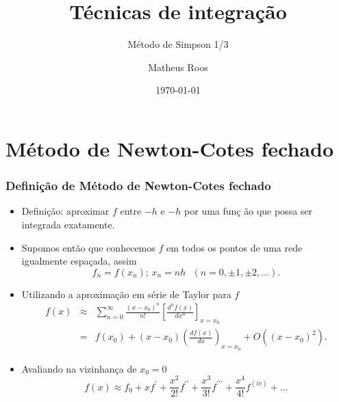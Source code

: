 \documentclass[xcolor=table]{beamer}
\begin{document}
\title[Simpson 1/3]{Técnicas de integração}
\subtitle{Método de Simpson 1/3}
\author[Roos]{Matheus Roos}
\date{\today}
\maketitle

\begin{frame}
	\tableofcontents
\end{frame}

\section{M\'{e}todo de Newton-Cotes fechado}

\begin{frame}%

\frametitle{Defini\c{c}\~{a}o de M\'{e}todo de Newton-Cotes fechado}

\begin{itemize}
\item Defini\c{c}\~{a}o: aproximar $f$ entre $-h$ e $-h$ por uma fun\c{c}%
\~{a}o que possa ser integrada exatamente.

\item Supomos ent\~{a}o que conhecemos $f$ em todos os pontos de uma rede
igualmente espa\c{c}ada, assim%
\[
f_{n}=f\left( x_{n}\right) \text{; \ \ \ \ \ \ \ }x_{n}=nh\text{ \ \ \ }%
\left( n=0,\pm 1,\pm 2,...\right) . 
\]

\item Utilizando a aproxima\c{c}\~{a}o em s\'{e}rie de Taylor para $f$%
\begin{eqnarray*}
f\left( x\right)  &\approx &\sum_{n=0}^{\infty }\frac{\left( x-x_{0}\right)
^{n}}{n!}\left[ \frac{d^{n}f(x)}{dx^{n}}\right] _{x=x_{0}} \\
&=&f\left( x_{0}\right) +\left( x-x_{0}\right) \left( \frac{df\left(
x\right) }{dx}\right) _{x=x_{0}}+O\left( \left( x-x_{0}\right) ^{2}\right) .
\end{eqnarray*}

\item Avaliando na vizinhan\c{c}a de $x_{0}=0$%
\[
f\left( x\right) \approx f_{0}+xf^{\prime }+\frac{x^{2}}{2!}f^{\prime \prime
}+\frac{x^{3}}{3!}f^{\prime \prime \prime }+\frac{x^{4}}{4!}f^{\left(
iv\right) } + ...
\]
\end{itemize}

\transboxout%
\end{frame}%
\end{document}
